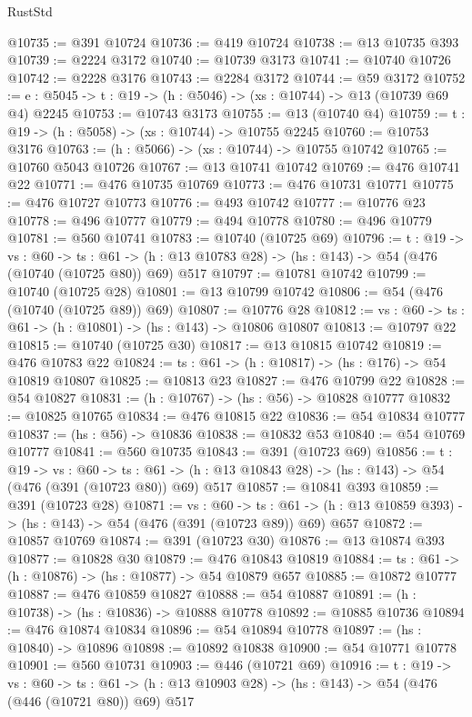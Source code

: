 \begin{lexlean}{RustStd}
\begin{coremodule}
@10735 := @391 @10724
@10736 := @419 @10724
@10738 := @13 @10735 @393
@10739 := @2224 @3172
@10740 := @10739 @3173
@10741 := @10740 @10726
@10742 := @2228 @3176
@10743 := @2284 @3172
@10744 := @59 @3172
@10752 := {e : @5045} -> {t : @19} -> (h : @5046) -> (xs : @10744) -> @13 (@10739 @69 @4) @2245
@10753 := @10743 @3173
@10755 := @13 (@10740 @4)
@10759 := {t : @19} -> (h : @5058) -> (xs : @10744) -> @10755 @2245
@10760 := @10753 @3176
@10763 := (h : @5066) -> (xs : @10744) -> @10755 @10742
@10765 := @10760 @5043 @10726
@10767 := @13 @10741 @10742
@10769 := @476 @10741 @22
@10771 := @476 @10735 @10769
@10773 := @476 @10731 @10771
@10775 := @476 @10727 @10773
@10776 := @493 @10742
@10777 := @10776 @23
@10778 := @496 @10777
@10779 := @494 @10778
@10780 := @496 @10779
@10781 := @560 @10741
@10783 := @10740 (@10725 @69)
@10796 := {t : @19} ->
  {vs : @60} ->
  {ts : @61} -> (h : @13 @10783 @28) -> (hs : @143) -> @54 (@476 (@10740 (@10725 @80)) @69) @517
@10797 := @10781 @10742
@10799 := @10740 (@10725 @28)
@10801 := @13 @10799 @10742
@10806 := @54 (@476 (@10740 (@10725 @89)) @69)
@10807 := @10776 @28
@10812 := {vs : @60} -> {ts : @61} -> (h : @10801) -> (hs : @143) -> @10806 @10807
@10813 := @10797 @22
@10815 := @10740 (@10725 @30)
@10817 := @13 @10815 @10742
@10819 := @476 @10783 @22
@10824 := {ts : @61} -> (h : @10817) -> (hs : @176) -> @54 @10819 @10807
@10825 := @10813 @23
@10827 := @476 @10799 @22
@10828 := @54 @10827
@10831 := (h : @10767) -> (hs : @56) -> @10828 @10777
@10832 := @10825 @10765
@10834 := @476 @10815 @22
@10836 := @54 @10834 @10777
@10837 := (hs : @56) -> @10836
@10838 := @10832 @53
@10840 := @54 @10769 @10777
@10841 := @560 @10735
@10843 := @391 (@10723 @69)
@10856 := {t : @19} ->
  {vs : @60} ->
  {ts : @61} -> (h : @13 @10843 @28) -> (hs : @143) -> @54 (@476 (@391 (@10723 @80)) @69) @517
@10857 := @10841 @393
@10859 := @391 (@10723 @28)
@10871 := {vs : @60} ->
  {ts : @61} -> (h : @13 @10859 @393) -> (hs : @143) -> @54 (@476 (@391 (@10723 @89)) @69) @657
@10872 := @10857 @10769
@10874 := @391 (@10723 @30)
@10876 := @13 @10874 @393
@10877 := @10828 @30
@10879 := @476 @10843 @10819
@10884 := {ts : @61} -> (h : @10876) -> (hs : @10877) -> @54 @10879 @657
@10885 := @10872 @10777
@10887 := @476 @10859 @10827
@10888 := @54 @10887
@10891 := (h : @10738) -> (hs : @10836) -> @10888 @10778
@10892 := @10885 @10736
@10894 := @476 @10874 @10834
@10896 := @54 @10894 @10778
@10897 := (hs : @10840) -> @10896
@10898 := @10892 @10838
@10900 := @54 @10771 @10778
@10901 := @560 @10731
@10903 := @446 (@10721 @69)
@10916 := {t : @19} ->
  {vs : @60} ->
  {ts : @61} -> (h : @13 @10903 @28) -> (hs : @143) -> @54 (@476 (@446 (@10721 @80)) @69) @517

\end{coremodule}
\end{lexlean}
